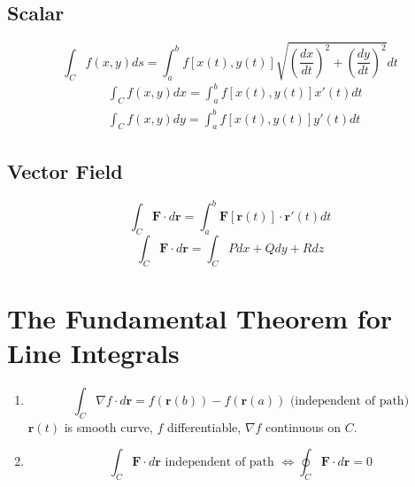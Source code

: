 \documentclass{article}
\begin{document}
\subsection*{Scalar}
    \begin{equation}
        \int_C f(x,y)ds = \int^b_a f[x(t),y(t)]\sqrt{(\frac{dx}{dt})^2+(\frac{dy}{dt})^2}dt
    \end{equation}
    \begin{align}
        &\int_C f(x,y)dx = \int^b_a f[x(t),y(t)]x'(t)dt\\
        &\int_C f(x,y)dy = \int^b_a f[x(t),y(t)]y'(t)dt
    \end{align}

\subsection*{Vector Field}
    \begin{equation}
        \int_C \boldsymbol{F}\cdot d\boldsymbol{r}=\int^b_a\boldsymbol{F}[\boldsymbol{r}(t)]\cdot\boldsymbol{r}'(t)dt
    \end{equation}
    \begin{equation}
        \int_C\boldsymbol{F}\cdot d\boldsymbol{r}=\int_CPdx+Qdy+Rdz
    \end{equation}
     \vspace{0.5pt}

\section{The Fundamental Theorem for Line Integrals}

    \begin{enumerate}
        \item
            
            \begin{equation}
                \int_C\nabla f\cdot d\boldsymbol{r}=f(\boldsymbol{r}(b))-f(\boldsymbol{r}(a)) \text{ (independent of path)}
            \end{equation}
            $\boldsymbol{r}(t)$ is smooth curve, $f$ differentiable, $\nabla f$ continuous on $C$.

        \item 
            \begin{equation*}
                \int_C \boldsymbol{F}\cdot d\boldsymbol{r} \text{ independent of path }\Longleftrightarrow \oint_C \boldsymbol{F}\cdot d\boldsymbol{r} = 0 
            \end{equation*}
    \end{enumerate}
    \vspace{0.5pt}
\end{document}
